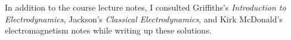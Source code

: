 \documentclass[11pt]{article}
\begin{document}
\newcommand{\vl}{\vb{l}}
\newcommand{\vL}{\vb{L}}
\newcommand{\ly}{l_y}
\newcommand{\cPi}{\cP_i}
\newcommand{\Tij}{T_{ij}}
\newcommand{\del}{\delta}
\newcommand{\delij}{\del_{ij}}
\newcommand{\vf}{\vb{f}}
\newcommand{\vT}{\vb{T}}

\newcommand{\Ex}{E_x}
\newcommand{\Ey}{E_y}
\newcommand{\Ez}{E_z}
\newcommand{\Bx}{B_x}
\newcommand{\By}{B_y}
\newcommand{\Bz}{B_z}
\newcommand{\intii}{\int_{-\infty}^\infty}

\clearpage



\vfill
In addition to the course lecture notes, I consulted Griffiths's \emph{Introduction to Electrodynamics}, Jackson's \emph{Classical Electrodynamics}, and Kirk McDonald's electromagnetism notes while writing up these solutions.
\end{document}
